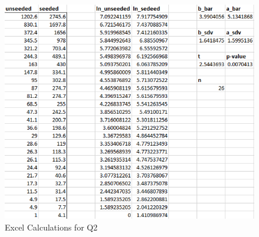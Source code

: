 \documentclass[12pt]{article}
\begin{document}
\begin{figure}[H]
    \centering
    \includegraphics[width=\textwidth]{Images/Q2.png}
    \caption{Excel Calculations for Q2}
    \label{fig:2-excel}
\end{figure} 

\newpage 
\end{document}
